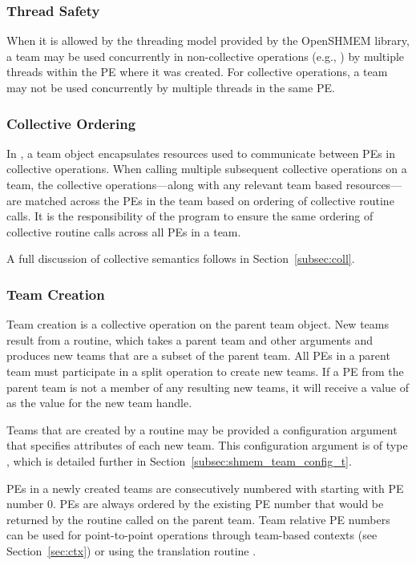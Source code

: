 \subsubsection*{Thread Safety}

When it is allowed by the threading model provided by the OpenSHMEM
library, a team may be used concurrently in non-collective operations
(e.g., ) by multiple threads within the
\ac{PE} where it was created.
For collective operations, a team may not be used concurrently by
multiple threads in the same \ac{PE}.

\subsubsection*{Collective Ordering}

In \openshmem, a team object encapsulates resources used to communicate
between \acp{PE} in collective operations. When calling multiple subsequent
collective operations on a team, the collective operations---along with any
relevant team based resources---are matched across the \acp{PE} in the team
based on ordering of collective routine calls. It is the responsibility
of the \openshmem program to ensure the same ordering of collective routine calls
across all \acp{PE} in a team.

A full discussion of collective semantics follows in Section~\ref{subsec:coll}.

\subsubsection*{Team Creation}

Team creation is a collective operation on the parent team object. New teams
result from a  routine, which takes a parent team
and other arguments and produces new teams that are a subset of the parent
team. All \acp{PE} in a parent team must participate in a split operation
to create new teams. If a \ac{PE} from the parent team is not a member of any
resulting new teams, it will receive a value of 
as the value for the new team handle.

Teams that are created by a  routine may be
provided a configuration argument that specifies attributes of each new team.
This configuration argument is of type , which
is detailed further in Section~\ref{subsec:shmem_team_config_t}.

\acp{PE} in a newly created teams are consecutively numbered with starting with
\ac{PE} number 0. \acp{PE} are always ordered by the existing \ac{PE} number that
would be returned by the  routine called on the parent team. Team relative \ac{PE}
numbers can be used for point-to-point operations through team-based
contexts (see Section~\ref{sec:ctx}) or using the translation routine
.

